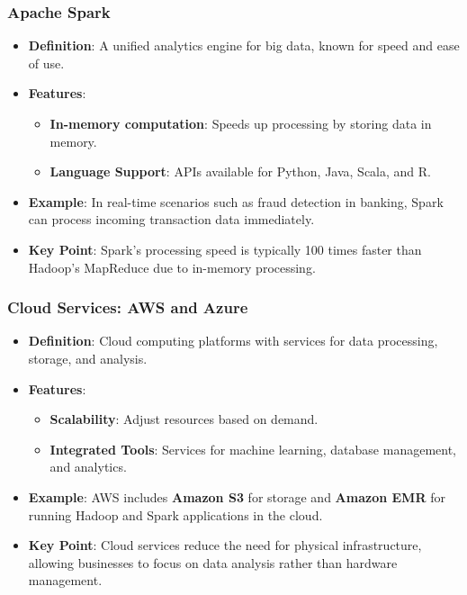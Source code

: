 \documentclass{beamer}
\begin{document}
\begin{frame}[fragile]
    \frametitle{Apache Spark}
    \begin{itemize}
        \item \textbf{Definition}: A unified analytics engine for big data, known for speed and ease of use.
        \item \textbf{Features}:
            \begin{itemize}
                \item \textbf{In-memory computation}: Speeds up processing by storing data in memory.
                \item \textbf{Language Support}: APIs available for Python, Java, Scala, and R.
            \end{itemize}
        \item \textbf{Example}: In real-time scenarios such as fraud detection in banking, Spark can process incoming transaction data immediately.
        \item \textbf{Key Point}: Spark’s processing speed is typically 100 times faster than Hadoop’s MapReduce due to in-memory processing.
    \end{itemize}
\end{frame}

\begin{frame}[fragile]
    \frametitle{Cloud Services: AWS and Azure}
    \begin{itemize}
        \item \textbf{Definition}: Cloud computing platforms with services for data processing, storage, and analysis.
        \item \textbf{Features}:
            \begin{itemize}
                \item \textbf{Scalability}: Adjust resources based on demand.
                \item \textbf{Integrated Tools}: Services for machine learning, database management, and analytics.
            \end{itemize}
        \item \textbf{Example}: AWS includes \textbf{Amazon S3} for storage and \textbf{Amazon EMR} for running Hadoop and Spark applications in the cloud.
        \item \textbf{Key Point}: Cloud services reduce the need for physical infrastructure, allowing businesses to focus on data analysis rather than hardware management.
    \end{itemize}
\end{frame}
\end{document}
